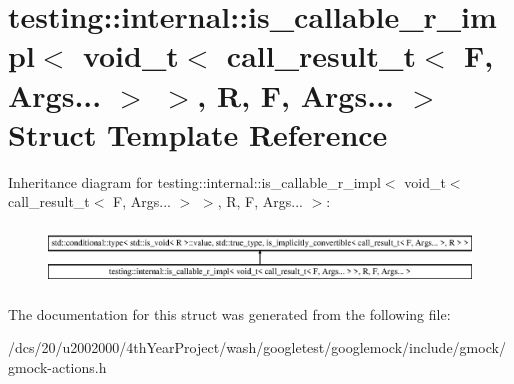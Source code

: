 \hypertarget{structtesting_1_1internal_1_1is__callable__r__impl_3_01void__t_3_01call__result__t_3_01F_00_01Ar35069a5339cf615f2b8c2ed10280b42b}{}\section{testing\+:\+:internal\+:\+:is\+\_\+callable\+\_\+r\+\_\+impl$<$ void\+\_\+t$<$ call\+\_\+result\+\_\+t$<$ F, Args... $>$ $>$, R, F, Args... $>$ Struct Template Reference}
\label{structtesting_1_1internal_1_1is__callable__r__impl_3_01void__t_3_01call__result__t_3_01F_00_01Ar35069a5339cf615f2b8c2ed10280b42b}
Inheritance diagram for testing\+:\+:internal\+:\+:is\+\_\+callable\+\_\+r\+\_\+impl$<$ void\+\_\+t$<$ call\+\_\+result\+\_\+t$<$ F, Args... $>$ $>$, R, F, Args... $>$\+:\begin{figure}[H]
\begin{center}
\leavevmode
\includegraphics[height=1.590909cm]{structtesting_1_1internal_1_1is__callable__r__impl_3_01void__t_3_01call__result__t_3_01F_00_01Ar35069a5339cf615f2b8c2ed10280b42b}
\end{center}
\end{figure}


The documentation for this struct was generated from the following file\+:\begin{DoxyCompactItemize}
\item 
/dcs/20/u2002000/4th\+Year\+Project/wash/googletest/googlemock/include/gmock/gmock-\/actions.\+h\end{DoxyCompactItemize}
